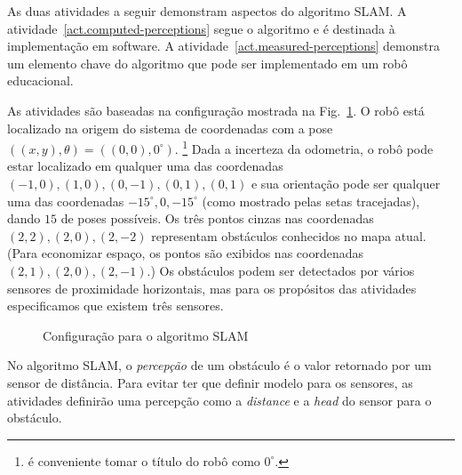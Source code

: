 As duas atividades a seguir demonstram aspectos do algoritmo SLAM. A atividade~\ref{act.computed-perceptions} segue o algoritmo e é destinada à implementação em software. A atividade~\ref{act.measured-perceptions} demonstra um elemento chave do algoritmo que pode ser implementado em um robô educacional.

As atividades são baseadas na configuração mostrada na Fig.~\ref{fig.slam-config}. O robô está localizado na origem do sistema de coordenadas com a pose $((x,y),\theta)=((0,0),0^\circ)$. \footnote{é conveniente tomar o título do robô como $0^\circ$.} Dada a incerteza da odometria, o robô pode estar localizado em qualquer uma das coordenadas $(-1,0), (1,0), (0,-1), (0,1), (0,1)$ e sua orientação pode ser qualquer uma das coordenadas $-15^\circ{}, 0, -15^\circ$ (como mostrado pelas setas tracejadas), dando $15$ de poses possíveis. Os três pontos cinzas nas coordenadas $(2,2), (2,0), (2,-2)$ representam obstáculos conhecidos no mapa atual. (Para economizar espaço, os pontos são exibidos nas coordenadas $(2,1), (2,0), (2,-1)$.) Os obstáculos podem ser detectados por vários sensores de proximidade horizontais, mas para os propósitos das atividades especificamos que existem três sensores.

\begin{figure}
\begin{center}
\caption{Configuração para o algoritmo SLAM}\label{fig.slam-config}
\end{center}
\end{figure}

No algoritmo SLAM, o \emph{percepção} de um obstáculo é o valor retornado por um sensor de distância. Para evitar ter que definir modelo para os sensores, as atividades definirão uma percepção como a \emph{distance} e a \emph{head} do sensor para o obstáculo.

